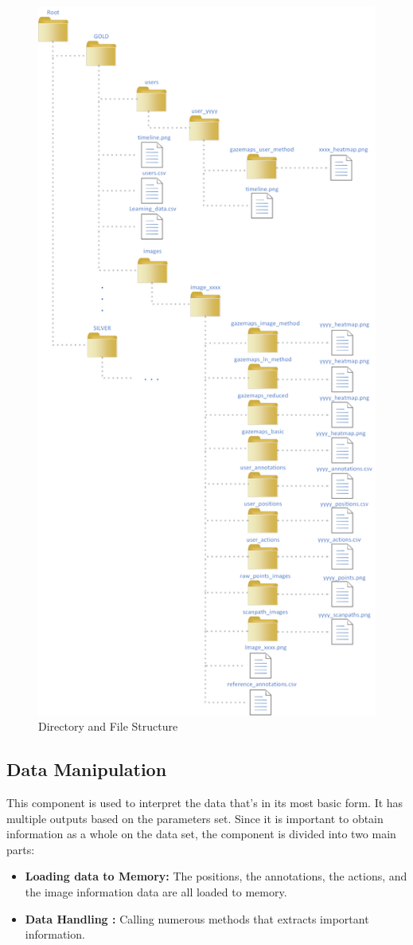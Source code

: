 \documentclass[a4paper,11pt]{report}
\numberwithin{figure}{chapter} %
\begin{document}
       \begin{figure}[H]
        \centering
         \includegraphics[width=.6\linewidth]{diagrams/directories.png}
         \caption{Directory and File Structure}
         \label{fig:struct}
       \end{figure}

	\subsection{Data Manipulation}

    This component is used to interpret the data that's in its most basic form.
    It has multiple outputs based on the parameters set.
    Since it is important to obtain information as a whole on the data set, the component is divided into two main parts:
    \begin{itemize}
        \item[\textbullet] \textbf{Loading data to Memory:} The positions, the annotations, the actions, and the image information data are all loaded to memory.
        \item[\textbullet] \textbf{Data Handling :} Calling numerous methods that extracts important information.
    \end{itemize}
\end{document}
